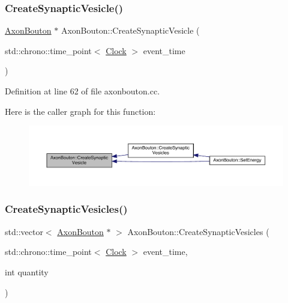 \subsubsection{\texorpdfstring{Create\+Synaptic\+Vesicle()}{CreateSynapticVesicle()}}
{\footnotesize\ttfamily \hyperlink{class_axon_bouton}{Axon\+Bouton} $\ast$ Axon\+Bouton\+::\+Create\+Synaptic\+Vesicle (\begin{DoxyParamCaption}\item[{std\+::chrono\+::time\+\_\+point$<$ \hyperlink{universe_8h_a0ef8d951d1ca5ab3cfaf7ab4c7a6fd80}{Clock} $>$}]{event\+\_\+time }\end{DoxyParamCaption})}



Definition at line 62 of file axonbouton.\+cc.

Here is the caller graph for this function\+:\nopagebreak
\begin{figure}[H]
\begin{center}
\leavevmode
\includegraphics[width=350pt]{class_axon_bouton_a2aa0abe381f6e7c87c702189d01dfbf2_icgraph}
\end{center}
\end{figure}
\mbox{\label{class_axon_bouton_a0cabe429536722f14ae800c8579168b7}} 
\subsubsection{\texorpdfstring{Create\+Synaptic\+Vesicles()}{CreateSynapticVesicles()}}
{\footnotesize\ttfamily std\+::vector$<$ \hyperlink{class_axon_bouton}{Axon\+Bouton} $\ast$ $>$ Axon\+Bouton\+::\+Create\+Synaptic\+Vesicles (\begin{DoxyParamCaption}\item[{std\+::chrono\+::time\+\_\+point$<$ \hyperlink{universe_8h_a0ef8d951d1ca5ab3cfaf7ab4c7a6fd80}{Clock} $>$}]{event\+\_\+time,  }\item[{int}]{quantity }\end{DoxyParamCaption})}



